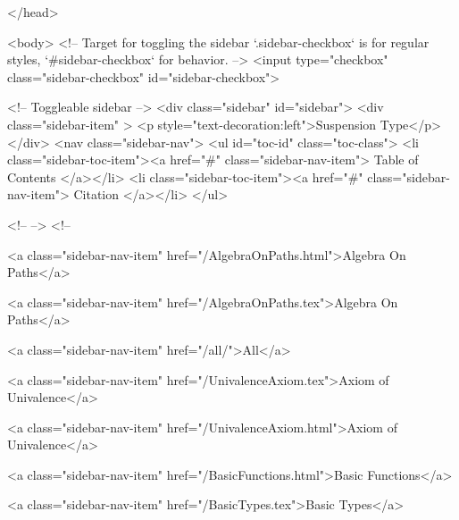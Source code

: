   
</head>




  <body>
    <!-- Target for toggling the sidebar `.sidebar-checkbox` is for regular
     styles, `#sidebar-checkbox` for behavior. -->
<input type="checkbox" class="sidebar-checkbox" id="sidebar-checkbox">

<!-- Toggleable sidebar -->
<div class="sidebar" id="sidebar">
  <div class="sidebar-item" >
    <p style="text-decoration:left">Suspension Type</p>
  </div>
  <nav class="sidebar-nav">
    <ul id="toc-id" class="toc-class">
  <li class="sidebar-toc-item"><a href="#" class="sidebar-nav-item"> Table of Contents </a></li>
  <li class="sidebar-toc-item"><a href="#" class="sidebar-nav-item"> Citation </a></li>
</ul>


    <!--  -->
    <!-- 
      
    
      
    
      
    
      
        
      
    
      
        
          <a class="sidebar-nav-item" href="/AlgebraOnPaths.html">Algebra On Paths</a>
        
      
    
      
        
          <a class="sidebar-nav-item" href="/AlgebraOnPaths.tex">Algebra On Paths</a>
        
      
    
      
        
          <a class="sidebar-nav-item" href="/all/">All</a>
        
      
    
      
        
          <a class="sidebar-nav-item" href="/UnivalenceAxiom.tex">Axiom of Univalence</a>
        
      
    
      
        
          <a class="sidebar-nav-item" href="/UnivalenceAxiom.html">Axiom of Univalence</a>
        
      
    
      
        
          <a class="sidebar-nav-item" href="/BasicFunctions.html">Basic Functions</a>
        
      
    
      
        
          <a class="sidebar-nav-item" href="/BasicTypes.tex">Basic Types</a>
        
